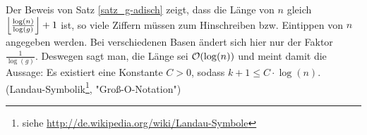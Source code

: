 Der Beweis von Satz \ref{satz_g-adisch} zeigt, dass die Länge von $n$ gleich $\floor*{\frac{\log(n)}{\log(g)}}+1$ ist, so viele Ziffern müssen zum Hinschreiben bzw. Eintippen von $n$ angegeben werden. Bei verschiedenen Basen ändert sich hier nur der Faktor $\frac{1}{\log(g)}$. Deswegen sagt man, die Länge sei $\oh(\log(n))$ und meint damit die Aussage: Es existiert eine Konstante $C > 0$, sodass $k + 1 \leq C \cdot \log(n)$. (Landau-Symbolik\footnote{siehe \url{http://de.wikipedia.org/wiki/Landau-Symbole}}, "Groß-O-Notation")

%
%
%
